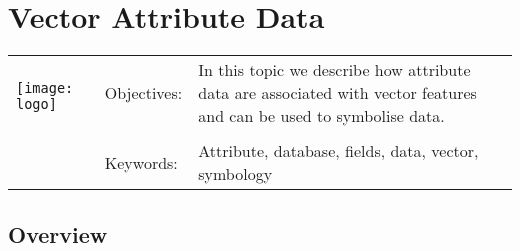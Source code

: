 

\section{Vector Attribute Data}\label{sec:attributes}
\begin{tabular}{p{3.5cm}p{6cm}p{6cm}}
\multirow{2}{*}{\texttt{[image: logo]}} & Objectives: &
In this topic we describe how attribute data are associated with vector
features and can be used to symbolise data. \\
& & \\
& Keywords: & 
Attribute, database, fields, data, vector, symbology \\
\hline
\end{tabular}

\subsection{Overview}\label{subsec:overview}


